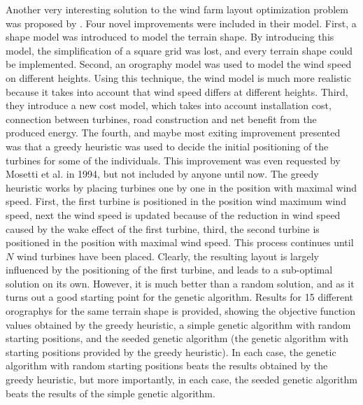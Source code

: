 \noindent Another very interesting solution to the wind farm layout optimization problem was proposed by \cite{Saavedra-Morena}. Four novel improvements were included in their model. First, a shape model was introduced to model the terrain shape. By introducing this model, the simplification of a square grid was lost, and every terrain shape could be implemented. Second, an orography model was used to model the wind speed on different heights. Using this technique, the wind model is much more realistic because it takes into account that wind speed differs at different heights. Third, they introduce a new cost model, which takes into account installation cost, connection between turbines, road construction and net benefit from the produced energy. The fourth, and maybe most exiting improvement presented  was that a greedy heuristic was used to decide the initial positioning of the turbines for some of the individuals. This improvement was even requested by Mosetti et al. in 1994, but not included by anyone until now. The greedy heuristic works by placing turbines one by one in the position with maximal wind speed. First, the first turbine is positioned in the position wind maximum wind speed, next the wind speed is updated because of the reduction in wind speed caused by the wake effect of the first turbine, third, the second turbine is positioned in the position with maximal wind speed. This process continues until $N$ wind turbines have been placed. Clearly, the resulting layout is largely influenced by the positioning of the first turbine, and leads to a sub-optimal solution on its own. However, it is much better than a random solution, and as it turns out a good starting point for the genetic algorithm. Results for 15 different orographys for the same terrain shape is provided, showing the objective function values obtained by the greedy heuristic, a simple genetic algorithm with random starting positions, and the seeded genetic algorithm (the genetic algorithm with starting positions provided by the greedy heuristic). In each case, the genetic algorithm with random starting positions beats the results obtained by the greedy heuristic, but more importantly, in each case, the seeded genetic algorithm beats the results of the simple genetic algorithm. \\


